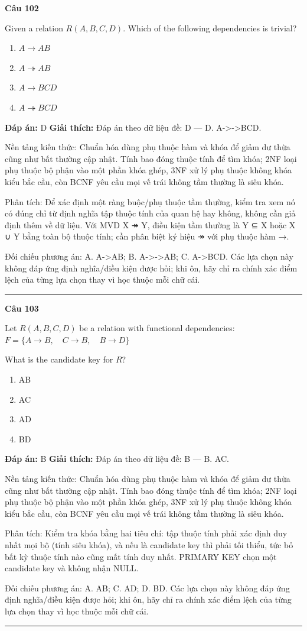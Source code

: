 \documentclass[11pt,a4paper]{article}
\newenvironment{question}[1]{%
  \par\vspace{1em}\noindent\textbf{\large Câu #1}\par\vspace{0.4em}
}{%
  \par\vspace{1em}\hrule\vspace{0.6em}
}
\newenvironment{choices}{%
  \begin{enumerate}[label=\textbf{\Alph*.},leftmargin=2.2em,itemsep=2pt,topsep=3pt]
}{%
  \end{enumerate}
}
\newcommand{\choice}{\item}
\begin{document}
\begin{question}{102}
Given a relation \(R(A, B, C, D)\). Which of the following dependencies is trivial?
\begin{choices}
\choice \(A \rightarrow AB\)
\choice \(A \twoheadrightarrow AB\)
\choice \(A \rightarrow BCD\)
\choice \(A \twoheadrightarrow BCD\)
\end{choices}
\textbf{Đáp án:} D
\textbf{Giải thích:} Đáp án theo dữ liệu đề: D — D. A->->BCD.

Nền tảng kiến thức: Chuẩn hóa dùng phụ thuộc hàm và khóa để giảm dư thừa cũng như bất thường cập nhật. Tính bao đóng thuộc tính để tìm khóa; 2NF loại phụ thuộc bộ phận vào một phần khóa ghép, 3NF xử lý phụ thuộc không khóa kiểu bắc cầu, còn BCNF yêu cầu mọi vế trái không tầm thường là siêu khóa.

Phân tích: Để xác định một ràng buộc/phụ thuộc tầm thường, kiểm tra xem nó có đúng chỉ từ định nghĩa tập thuộc tính của quan hệ hay không, không cần giả định thêm về dữ liệu. Với MVD X ↠ Y, điều kiện tầm thường là Y ⊆ X hoặc X ∪ Y bằng toàn bộ thuộc tính; cần phân biệt ký hiệu ↠ với phụ thuộc hàm →.

Đối chiếu phương án: A. A->AB; B. A->->AB; C. A->BCD. Các lựa chọn này không đáp ứng định nghĩa/điều kiện được hỏi; khi ôn, hãy chỉ ra chính xác điểm lệch của từng lựa chọn thay vì học thuộc mỗi chữ cái.
\end{question}

\begin{question}{103}
Let \(R(A, B, C, D)\) be a relation with functional dependencies:
\(F = \{ A \rightarrow B, \quad C \rightarrow B, \quad B \rightarrow D \}\)

What is the candidate key for \(R\)?
\begin{choices}
\choice AB
\choice AC
\choice AD
\choice BD
\end{choices}
\textbf{Đáp án:} B
\textbf{Giải thích:} Đáp án theo dữ liệu đề: B — B. AC.

Nền tảng kiến thức: Chuẩn hóa dùng phụ thuộc hàm và khóa để giảm dư thừa cũng như bất thường cập nhật. Tính bao đóng thuộc tính để tìm khóa; 2NF loại phụ thuộc bộ phận vào một phần khóa ghép, 3NF xử lý phụ thuộc không khóa kiểu bắc cầu, còn BCNF yêu cầu mọi vế trái không tầm thường là siêu khóa.

Phân tích: Kiểm tra khóa bằng hai tiêu chí: tập thuộc tính phải xác định duy nhất mọi bộ (tính siêu khóa), và nếu là candidate key thì phải tối thiểu, tức bỏ bất kỳ thuộc tính nào cũng mất tính duy nhất. PRIMARY KEY chọn một candidate key và không nhận NULL.

Đối chiếu phương án: A. AB; C. AD; D. BD. Các lựa chọn này không đáp ứng định nghĩa/điều kiện được hỏi; khi ôn, hãy chỉ ra chính xác điểm lệch của từng lựa chọn thay vì học thuộc mỗi chữ cái.
\end{question}
\end{document}
